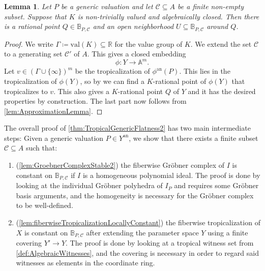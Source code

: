 \documentclass[12pt,reqno,a4paper]{amsart}
\theoremstyle{theoremstyle}
\newtheorem{lemma}[theorem]{Lemma}
\theoremstyle{examplestyle}
\theoremstyle{algorithmstyle}
\newcommand{\an}{{\mathrm{an}}}
\begin{document}
\begin{lemma}\label{lem:FindingRationalPoints}
  Let $P$ be a generic valuation and let $\mathcal{C}\subseteq A$ be a finite non-empty subset. Suppose that $K$ is non-trivially valued and algebraically closed. Then there is a rational point $Q\in \mathbb{B}_{P,\mathcal{C}}$ and an open neighborhood $U\subseteq \mathbb{B}_{P,\mathcal{C}}$ around $Q$.
\end{lemma}
\begin{proof}
    We write $\Gamma\coloneqq \mathrm{val}(K)\subseteq\mathbb{R}$ for the value group of $K$.
    We extend the set $\mathcal{C}$ to a generating set $\mathcal{C}'$ of $A$.  This gives a closed embedding
  \begin{equation*}
    \phi\colon Y\to\mathbb{A}^{m}.
  \end{equation*}
  Let $v\in(\Gamma\cup\{\infty\})^m$ be the tropicalization of $\phi^{\mathrm{an}}(P)$. This lies in the tropicalization of $\phi(Y)$, so by \cite[Theorem 3.2.3]{MS15} we can find a $K$-rational point of $\phi(Y)$ that tropicalizes to $v$. This also gives a $K$-rational point $Q$ of $Y$ and it has the desired properties by construction. The last part now follows from \cref{lem:ApproximationLemma}.
\end{proof}

The overall proof of \cref{thm:TropicalGenericFlatness2} has two main intermediate steps:  Given a generic valuation $P\in Y^\an$, we show that there exists a finite subset $\mathcal C\subseteq A$ such that:

\begin{enumerate}
\item (\cref{lem:GroebnerComplexStable2}) the fiberwise Gr\"obner complex of $I$ is constant on $\mathbb{B}_{P,\mathcal C}$ if $I$ is a homogeneous polynomial ideal. The proof is done by looking at the individual Gr\"obner polyhedra of $I_P$ and requires some Gr\"obner basis arguments, and the homogeneity is necessary for the Gr\"obner complex to be well-defined.
\item (\cref{lem:fiberwiseTropicalizationLocallyConstant}) the fiberwise tropicalization of $X$ is constant on $\mathbb{B}_{P,\mathcal C}$ after extending the parameter space $Y$ using a finite covering $Y'\to Y$. The proof is done by looking at a tropical witness set from \cref{def:AlgebraicWitnesses}, and the covering is necessary in order to regard said witnesses as elements in the coordinate ring. %
\end{enumerate}
\end{document}
